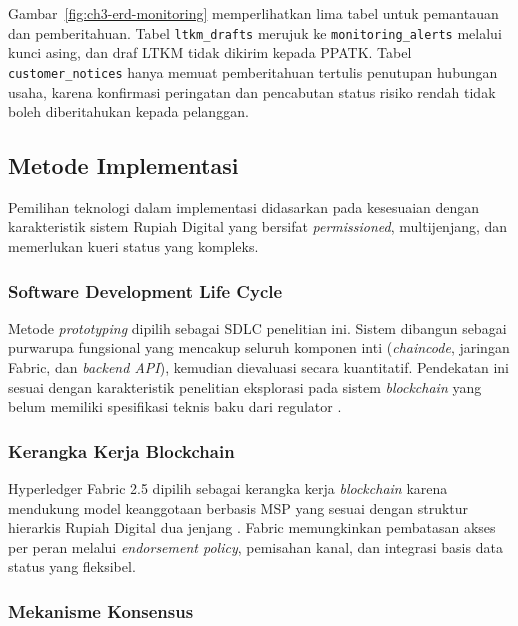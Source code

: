 Gambar~\ref{fig:ch3-erd-monitoring} memperlihatkan lima tabel untuk pemantauan dan pemberitahuan. Tabel \texttt{ltkm\_drafts} merujuk ke \texttt{monitoring\_alerts} melalui kunci asing, dan draf LTKM tidak dikirim kepada PPATK. Tabel \texttt{customer\_notices} hanya memuat pemberitahuan tertulis penutupan hubungan usaha, karena konfirmasi peringatan dan pencabutan status risiko rendah tidak boleh diberitahukan kepada pelanggan.



\subsection{Metode Implementasi}

Pemilihan teknologi dalam implementasi didasarkan pada kesesuaian dengan
karakteristik sistem Rupiah Digital yang bersifat \textit{permissioned},
multijenjang, dan memerlukan kueri status yang kompleks.

\subsubsection{Software Development Life Cycle}

Metode \textit{prototyping} dipilih sebagai SDLC penelitian ini. Sistem dibangun
sebagai purwarupa fungsional yang mencakup seluruh komponen inti (\textit{chaincode},
jaringan Fabric, dan \textit{backend API}), kemudian dievaluasi secara
kuantitatif. Pendekatan ini sesuai dengan karakteristik penelitian eksplorasi
pada sistem \textit{blockchain} yang belum memiliki spesifikasi teknis baku dari
regulator \cite{bi_consultative}.

\subsubsection{Kerangka Kerja Blockchain}

Hyperledger Fabric 2.5 dipilih sebagai kerangka kerja \textit{blockchain} karena
mendukung model keanggotaan berbasis MSP yang sesuai dengan struktur hierarkis
Rupiah Digital dua jenjang \cite{androulaki2018}. Fabric memungkinkan pembatasan
akses per peran melalui \textit{endorsement policy}, pemisahan kanal, dan
integrasi basis data status yang fleksibel.

\subsubsection{Mekanisme Konsensus}

